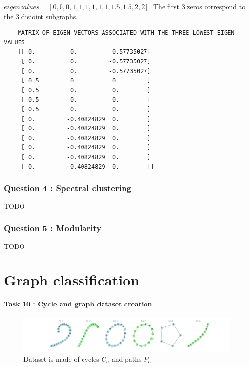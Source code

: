 \documentclass[a4paper]{article}
\begin{document}
$eigen values = [0, 0, 0, 1 , 1, 1, 1, 1, 1, 1.5, 1.5, 2, 2]$. 
The first 3 zeros correspond to the 3 disjoint subgraphs.


\begin{verbatim}
    MATRIX OF EIGEN VECTORS ASSOCIATED WITH THE THREE LOWEST EIGEN VALUES
    [[ 0.          0.         -0.57735027]
     [ 0.          0.         -0.57735027]
     [ 0.          0.         -0.57735027]
     [ 0.5         0.          0.        ]
     [ 0.5         0.          0.        ]
     [ 0.5         0.          0.        ]
     [ 0.5         0.          0.        ]
     [ 0.         -0.40824829  0.        ]
     [ 0.         -0.40824829  0.        ]
     [ 0.         -0.40824829  0.        ]
     [ 0.         -0.40824829  0.        ]
     [ 0.         -0.40824829  0.        ]
     [ 0.         -0.40824829  0.        ]]     
\end{verbatim}

\section{Question 4 : Spectral clustering}
TODO 
\section{Question 5 : Modularity}
TODO
\pagebreak
\part[short]{Graph classification}

\subsection*{Task 10 : Cycle and graph dataset creation}

\begin{figure}[ht]
        \centering
        \includegraphics[width=1.\textwidth]{figures/cycle_and_paths_dataset.png}
        \caption{Dataset is made of cycles $C_n$ and paths $P_n$}
        \label{fig:cycle_and_paths_dataset}
\end{figure}
\end{document}
